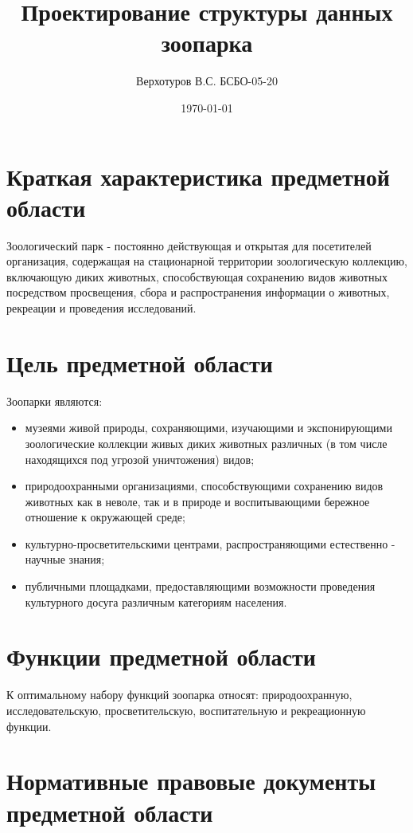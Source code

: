 \documentclass[12pt, a4paper]{article}
\title{Проектирование структуры данных зоопарка}
\author{Верхотуров В.С. БСБО-05-20}
\affil{РТУ МИРЭА}
\date{\today}
\begin{document}
\maketitle

\section{Краткая характеристика предметной области}

Зоологический парк - постоянно действующая и открытая для посетителей организация, содержащая на стационарной территории зоологическую коллекцию, включающую диких животных, способствующая сохранению видов животных посредством просвещения, сбора и распространения информации о животных, рекреации и проведения исследований.


\section{Цель предметной области}

Зоопарки являются:
\begin{itemize}
    \item музеями живой природы, сохраняющими, изучающими и экспонирующими зоологические коллекции живых диких животных различных (в том числе находящихся под угрозой уничтожения) видов;
    
    \item природоохранными организациями, способствующими сохранению видов животных как в неволе, так и в природе и воспитывающими бережное отношение к окружающей среде;
    
    \item культурно-просветительскими центрами, распространяющими естественно - научные знания;
    
    \item публичными площадками, предоставляющими возможности проведения культурного досуга различным категориям населения.
\end{itemize}

\section{Функции предметной области}

К оптимальному набору функций зоопарка относят: природоохранную, исследовательскую, просветительскую, воспитательную и рекреационную функции.

\section{Нормативные правовые документы предметной области}
\end{document}
